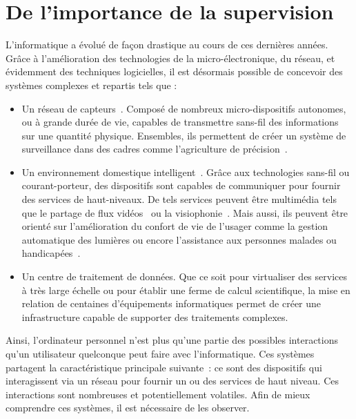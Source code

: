 \section{De l'importance de la supervision}\label{sec:intro:contexte}

L'informatique a évolué de façon drastique au cours de ces dernières années. Grâce à l'amélioration des technologies de la micro-électronique, du réseau, et évidemment des techniques logicielles, il est désormais possible de concevoir des systèmes complexes et repartis tels que :
\begin{itemize}
 \item Un réseau de capteurs~\cite{Akyildiz:wsn, Szewczyk:monitoring}. Composé de nombreux micro-dispositifs autonomes, ou à grande durée de vie, capables de transmettre sans-fil des informations sur une quantité physique. Ensembles, ils permettent de créer un système de surveillance dans des cadres comme l'agriculture de précision~\cite{Jurdak:sumac}.
 \item Un environnement domestique intelligent~\cite{Harper:smarthome, Chan:smarthome, Coyle:assisted}. Grâce aux technologies sans-fil ou courant-porteur, des dispositifs sont capables de communiquer pour fournir des services de haut-niveaux. De tels services peuvent être multimédia tels que le partage de flux vidéos~\cite{Kang:upnpav} ou la visiophonie~\cite{Vilei:videophone}. Mais aussi, ils peuvent être orienté sur l'amélioration du confort de vie de l'usager comme la gestion automatique des lumières ou encore l'assistance aux personnes malades ou handicapées~\cite{Korhonen:health}.
 \item Un centre de traitement de données. Que ce soit pour virtualiser des services à très large échelle ou pour établir une ferme de calcul scientifique, la mise en relation de centaines d'équipements informatiques permet de créer une infrastructure capable de supporter des traitements complexes.
\end{itemize}

Ainsi, l'ordinateur personnel n'est plus qu'une partie des possibles interactions qu'un utilisateur quelconque peut faire avec l'informatique. Ces systèmes partagent la caractéristique principale suivante~: ce sont des dispositifs qui interagissent via un réseau pour fournir un ou des services de haut niveau. Ces interactions sont nombreuses et potentiellement volatiles. Afin de mieux comprendre ces systèmes, il est nécessaire de les observer.

